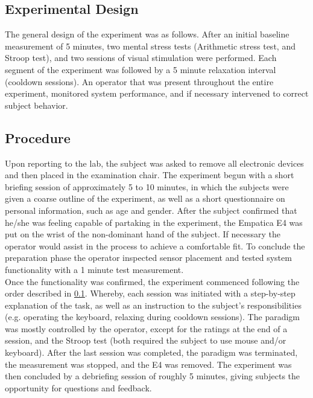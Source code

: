 \subsection{Experimental Design}\label{expdes}
The general design of the experiment was as follows.
After an initial baseline measurement of 5 minutes, two mental stress tests (Arithmetic stress test, and Stroop test), and two sessions of visual stimulation were performed. Each segment of the experiment was followed by a 5 minute relaxation interval (cooldown sessions). An operator that was present throughout the entire experiment, monitored system performance, and if necessary intervened to correct subject behavior.  
\subsection{Procedure}
Upon reporting to the lab, the subject was asked to remove all electronic devices and then placed in the examination chair. The experiment begun with a short briefing session of approximately 5 to 10 minutes, in which the subjects were given a coarse outline of the experiment, as well as a short questionnaire on personal information, such as age and gender. After the subject confirmed that he/she was feeling capable of partaking in the experiment, the Empatica E4 was put on the wrist of the non-dominant hand of the subject. If necessary the operator would assist in the process to achieve a comfortable fit. To conclude the preparation phase the operator inspected sensor placement and tested system functionality with a 1 minute test measurement.\\
Once the functionality was confirmed, the experiment commenced following the order described in \ref{expdes}. Whereby, each session was initiated with a step-by-step explanation of the task, as well as an instruction to the subject's responsibilities (e.g. operating the keyboard, relaxing during cooldown sessions). The paradigm was mostly controlled by the operator, except for the ratings at the end of a session, and the Stroop test (both required the subject to use mouse and/or keyboard).
After the last session was completed, the paradigm was terminated, the measurement was stopped, and the E4 was removed.
The experiment was then concluded by a debriefing session of roughly 5 minutes, giving subjects the opportunity for questions and feedback.



